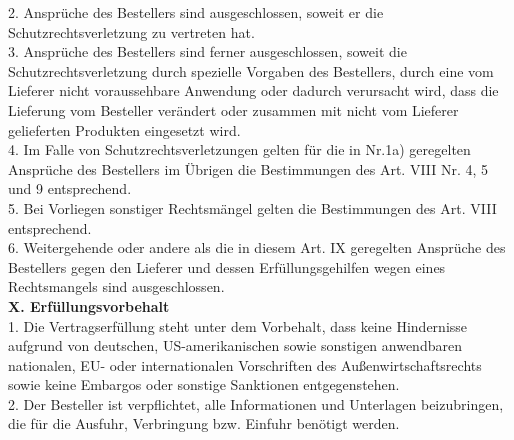 \begin{multicols}{2}
\begin{scriptsize}
	2. Ansprüche des Bestellers sind ausgeschlossen, soweit er die Schutzrechtsverletzung zu vertreten hat.\\
	3. Ansprüche des Bestellers sind ferner ausgeschlossen, soweit die Schutzrechtsverletzung durch spezielle Vorgaben des Bestellers, durch eine vom Lieferer nicht voraussehbare Anwendung oder dadurch verursacht wird, dass die Lieferung vom Besteller verändert oder zusammen mit nicht vom Lieferer gelieferten Produkten eingesetzt wird.\\
	4. Im Falle von Schutzrechtsverletzungen gelten für die in Nr.1a) geregelten Ansprüche des Bestellers im Übrigen die Bestimmungen des Art. VIII Nr. 4, 5 und 9 entsprechend.\\
	5. Bei Vorliegen sonstiger Rechtsmängel gelten die Bestimmungen des Art. VIII entsprechend.\\
	6. Weitergehende oder andere als die in diesem Art. IX geregelten Ansprüche des Bestellers gegen den Lieferer und dessen Erfüllungsgehilfen wegen eines Rechtsmangels sind ausgeschlossen.\\
	\textbf{X. Erfüllungsvorbehalt}\\
	1. Die Vertragserfüllung steht unter dem Vorbehalt, dass keine Hindernisse aufgrund von deutschen, US-amerikanischen sowie sonstigen anwendbaren nationalen, EU- oder internationalen Vorschriften des Außenwirtschaftsrechts sowie keine Embargos oder sonstige Sanktionen entgegenstehen.\\
	2. Der Besteller ist verpflichtet, alle Informationen und Unterlagen beizubringen, die für die Ausfuhr, Verbringung bzw. Einfuhr benötigt werden.
	

\end{scriptsize}
\end{multicols}
